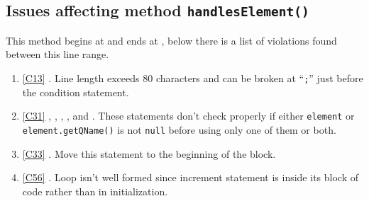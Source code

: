\subsection{Issues affecting method \texttt{handlesElement()}}
This method begins at  and ends at , below there is a list of violations found between this line range.
\begin{enumerate}
	\item \ref{C13} . Line length exceeds 80 characters and can be broken at ``\texttt{;}'' just before the condition statement. 	
	\item \ref{C31} , , , ,  and . These statements don't check properly if either \texttt{element} or \texttt{element.getQName()} is not \texttt{null} before using only one of them or both.
	\item \ref{C33} . Move this statement to the beginning of the block.
	\item \ref{C56} . Loop isn't well formed since increment statement is inside its block of code rather than in initialization. 
\end{enumerate}

